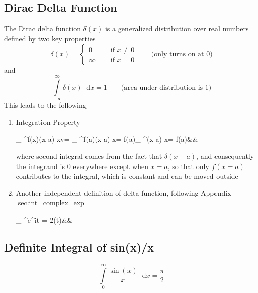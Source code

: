 \documentclass[11pt, a4paper]{article}
\newcommand{\diff}{\mathop{}\!\mathrm{d}}
\newcommand{\dx}{\diff x}
\newcommand{\domega}{\diff \omega}
\newcommand{\dint}[2]{\int \limits_{#1}^{#2}}  %
\newcommand{\intinfty}{\dint{-\infty}{\infty}}	%
\newcommand{\intzerotoinfty}{\dint{0}{\infty}}	%
\begin{document}
	\subsection{Dirac Delta Function}\label{sec:delta_func}
	The Dirac delta function $\delta(x)$ is a generalized distribution over real numbers defined by two key properties \cite{dirac1981qm}
	\begin{equation}\label{eq:delta_func_def}
		\delta (x) = \left\{
		\begin{array}{ll}
			0  &  \quad \text{ if } x \neq 0 \\
			\infty & \quad \text{ if } x = 0
		\end{array}
		\right. \qquad \text{(only turns on at $0$)}
	\end{equation}
	and
	\begin{equation}\label{eq:delta_func_area}
		\intinfty \delta (x) \dx = 1 \qquad \text{(area under distribution is $1$)}
	\end{equation}
	This leads to the following
	\begin{enumerate}
		\item Integration Property
		\begin{flalign}\label{eq:delta_func_integration_value}
			\intinfty f(x)\delta (x-a) \dx v= \intinfty f(a)\delta (x-a) \dx = f(a)\intinfty \delta (x-a) \dx = f(a)&&
		\end{flalign}
		where second integral comes from the fact that $\delta (x - a)$, and consequently the integrand is $0$ everywhere except when $x=a$, so that only $f(x=a)$ contributes to the integral, which is constant and can be moved outside
		\item Another independent definition of delta function, following Appendix \ref{sec:int_complex_exp}
		\begin{flalign}\label{eq:delta_func_def_complex_exp}
			\intinfty e^{i\omega t} \domega = 2\pi \delta (t)&&
		\end{flalign}
	\end{enumerate}
	
	\subsection{Definite Integral of sin(x)/x}\label{sec:int_sinx_by_x}
	\begin{equation}\label{eq:int_sinx_by_x}
		\intzerotoinfty \frac{\sin(x)}{x} \dx = \frac{\pi}{2}
	\end{equation}
	
\end{document}
